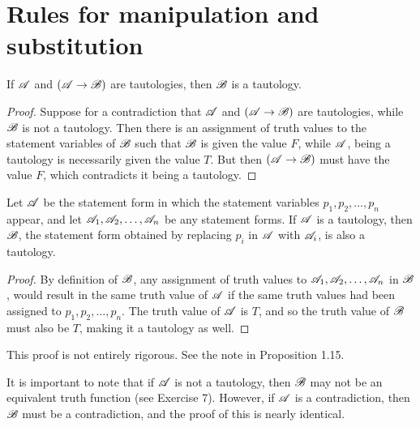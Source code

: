 \section{Rules for manipulation and substitution}

\setcounter{definition}{9}
\begin{proposition}
  If \(\mathscr{A}\) and \((\mathscr{A} \rightarrow \mathscr{B})\) are tautologies, then \(\mathscr{B}\) is a tautology.

  \begin{proof}
    Suppose for a contradiction that \(\mathscr{A}\) and \((\mathscr{A} \rightarrow \mathscr{B})\) are tautologies, while \(\mathscr{B}\) is not a tautology. Then there is an assignment of truth values to the statement variables of \(\mathscr{B}\) such that \(\mathscr{B}\) is given the value \(F\), while \(\mathscr{A}\), being a tautology is necessarily given the value \(T\). But then \((\mathscr{A} \rightarrow \mathscr{B})\) must have the value \(F\), which contradicts it being a tautology.
  \end{proof}
\end{proposition}

\begin{proposition}
  Let \(\mathscr{A}\) be the statement form in which the statement variables \(p_1, p_2, \dots, p_n\) appear, and let \(\mathscr{A}_1, \mathscr{A}_2, \dots, \mathscr{A}_n\) be any statement forms. If \(\mathscr{A}\) is a tautology, then \(\mathscr{B}\), the statement form obtained by replacing \(p_i\) in \(\mathscr{A}\) with \(\mathscr{A}_i\), is also a tautology.

  \begin{proof}
    By definition of \(\mathscr{B}\), any assignment of truth values to \(\mathscr{A}_1, \mathscr{A}_2, \dots, \mathscr{A}_n\) in \(\mathscr{B}\), would result in the same truth value of \(\mathscr{A}\) if the same truth values had been assigned to \(p_1, p_2, \dots, p_n\). The truth value of \(\mathscr{A}\) is \(T\), and so the truth value of \(\mathscr{B}\) must also be \(T\), making it a tautology as well.
  \end{proof}

  \note{} This proof is not entirely rigorous. See the note in Proposition 1.15.

  \note{} It is important to note that if \(\mathscr{A}\) is not a tautology, then \(\mathscr{B}\) may not be an equivalent truth function (see Exercise 7). However, if \(\mathscr{A}\) is a contradiction, then \(\mathscr{B}\) must be a contradiction, and the proof of this is nearly identical.
\end{proposition}

